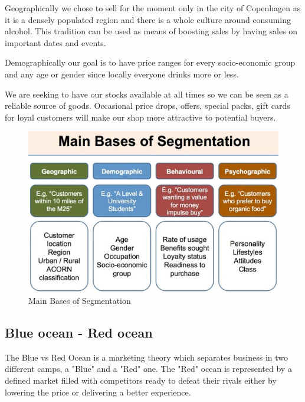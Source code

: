 \documentclass[12p]{article}
\begin{document}
Geographically we chose to sell for the moment only in the city of Copenhagen as it is a densely populated region and there is a whole culture around consuming alcohol. This tradition can be used as means of boosting sales by having sales on important dates and events.

Demographically our goal is to have price ranges for every socio-economic group and any age or gender since locally everyone drinks more or less.

We are seeking to have our stocks available at all times so we can be seen as a reliable source of goods. Occasional price drops, offers, special packs, gift cards for loyal customers will make our shop more attractive to potential buyers.

\begin{figure}
    \centering
    \includegraphics[width=1\textwidth]{market_segmentation}
    \caption{Main Bases of Segmentation \cite{MarketSegmentationBases}}
\end{figure}

\newpage


\subsection{Blue ocean - Red ocean} \label{BlueOceanRedOcean}

The Blue vs Red Ocean is a marketing theory which separates business in two different camps, a "Blue" and a "Red" one. The "Red" ocean is represented by a defined market filled with competitors ready to defeat their rivals either by lowering the price or delivering a better experience.
\end{document}
